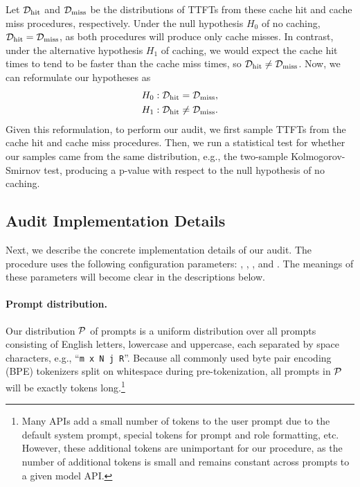 Let $\mathcal{D}_{\mathrm{hit}}$ and $\mathcal{D}_{\mathrm{miss}}$ be the distributions of TTFTs from these cache hit and cache miss procedures, respectively. Under the null hypothesis $H_0$ of no caching, $\mathcal{D}_{\mathrm{hit}} = \mathcal{D}_{\mathrm{miss}}$, as both procedures will produce only cache misses. In contrast, under the alternative hypothesis $H_1$ of caching, we would expect the cache hit times to tend to be faster than the cache miss times, so $\mathcal{D}_{\mathrm{hit}} \neq \mathcal{D}_{\mathrm{miss}}$. Now, we can reformulate our hypotheses as
\begin{align*}
    H_0 &: \mathcal{D}_{\mathrm{hit}} = \mathcal{D}_{\mathrm{miss}}, \\
    H_1 &: \mathcal{D}_{\mathrm{hit}} \neq \mathcal{D}_{\mathrm{miss}}.
\end{align*}
Given this reformulation, to perform our audit, we first sample TTFTs from the cache hit and cache miss procedures. Then, we run a statistical test for whether our samples came from the same distribution, e.g., the two-sample Kolmogorov-Smirnov test, producing a p-value with respect to the null hypothesis of no caching. 


\subsection{Audit Implementation Details}

Next, we describe the concrete implementation details of our audit. The procedure uses the following configuration parameters: \PromptLength{}, \PrefixFraction{}, \NumVictimRequests{}, and \NumSamples{}. The meanings of these parameters will become clear in the descriptions below.




\paragraph{Prompt distribution.} Our distribution $\mathcal{P}$ of prompts is a uniform distribution over all prompts consisting of \PromptLength{} English letters, lowercase and uppercase, each separated by space characters, e.g., ``\texttt{m x N j R}''. Because all commonly used byte pair encoding (BPE) tokenizers \citep{gage1994new,sennrich-etal-2016-neural} split on whitespace during pre-tokenization, all prompts in $\mathcal{P}$ will be exactly \PromptLength{} tokens long.\footnote{Many APIs add a small number of tokens to the user prompt due to the default system prompt, special tokens for prompt and role formatting, etc. However, these additional tokens are unimportant for our procedure, as the number of additional tokens is small and remains constant across prompts to a given model API.} 

